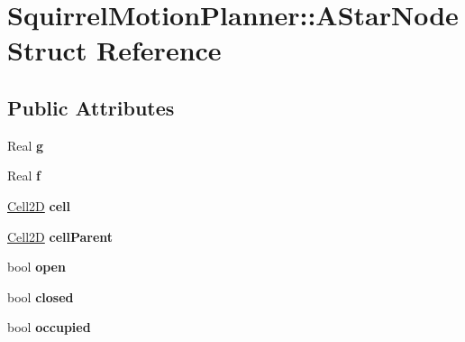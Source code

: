 \hypertarget{structSquirrelMotionPlanner_1_1AStarNode}{\section{Squirrel\-Motion\-Planner\-:\-:A\-Star\-Node Struct Reference}
\label{structSquirrelMotionPlanner_1_1AStarNode}
}
\subsection*{Public Attributes}
\begin{DoxyCompactItemize}
\item 
\hypertarget{structSquirrelMotionPlanner_1_1AStarNode_a48b4b99fcae7e0bb5d2e98eba3e0b258}{Real {\bfseries g}}\label{structSquirrelMotionPlanner_1_1AStarNode_a48b4b99fcae7e0bb5d2e98eba3e0b258}

\item 
\hypertarget{structSquirrelMotionPlanner_1_1AStarNode_a19b3011a11edbc4c2a1f6517f1fd06b9}{Real {\bfseries f}}\label{structSquirrelMotionPlanner_1_1AStarNode_a19b3011a11edbc4c2a1f6517f1fd06b9}

\item 
\hypertarget{structSquirrelMotionPlanner_1_1AStarNode_a45a0ea78a4b12e8be1e79e85cba599b7}{\hyperlink{structSquirrelMotionPlanner_1_1Cell2D}{Cell2\-D} {\bfseries cell}}\label{structSquirrelMotionPlanner_1_1AStarNode_a45a0ea78a4b12e8be1e79e85cba599b7}

\item 
\hypertarget{structSquirrelMotionPlanner_1_1AStarNode_a0b917fe0d642b5f1e0e30155de3aa57b}{\hyperlink{structSquirrelMotionPlanner_1_1Cell2D}{Cell2\-D} {\bfseries cell\-Parent}}\label{structSquirrelMotionPlanner_1_1AStarNode_a0b917fe0d642b5f1e0e30155de3aa57b}

\item 
\hypertarget{structSquirrelMotionPlanner_1_1AStarNode_a2e922336b122e67a7ce36ece0aadfb26}{bool {\bfseries open}}\label{structSquirrelMotionPlanner_1_1AStarNode_a2e922336b122e67a7ce36ece0aadfb26}

\item 
\hypertarget{structSquirrelMotionPlanner_1_1AStarNode_a3bc0807799250b64f7e3acfbe8636f56}{bool {\bfseries closed}}\label{structSquirrelMotionPlanner_1_1AStarNode_a3bc0807799250b64f7e3acfbe8636f56}

\item 
\hypertarget{structSquirrelMotionPlanner_1_1AStarNode_a6b742d1d8f515d3d4d6aac13d5223444}{bool {\bfseries occupied}}\label{structSquirrelMotionPlanner_1_1AStarNode_a6b742d1d8f515d3d4d6aac13d5223444}


\end{DoxyCompactItemize}
